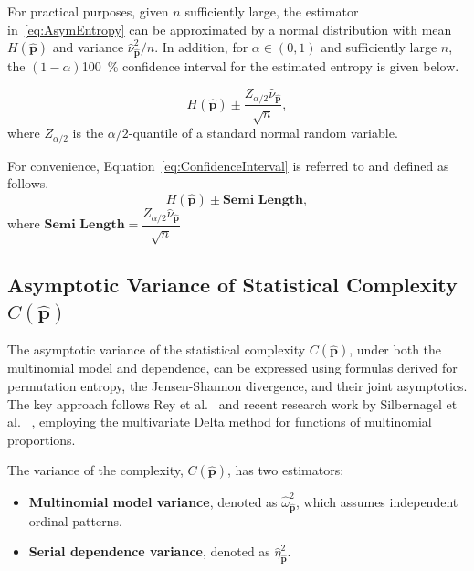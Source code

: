 For practical purposes, given $n$ sufficiently large, the estimator in~\eqref{eq:AsymEntropy} can be approximated by a normal distribution with mean $H(\widehat{\mathbf{p}})$ and variance $\widehat{\nu}^2_{\widehat{\mathbf{p}}}/n$. In addition, for $\alpha \in (0,1)$ and sufficiently large $n$, the $(1-\alpha)$\SI{100}{\percent} confidence interval for the estimated entropy is given below.

\begin{equation}
  H(\widehat{\mathbf{p}})\pm \dfrac{Z_{\alpha/2}\widehat{\nu}_{\widehat{\mathbf{p}}}}{\sqrt{n}},
  \label{eq:ConfidenceInterval}
\end{equation} 
where $Z_{\alpha/2}$ is the $\alpha/2$-quantile of a standard normal random variable.

For convenience, Equation~\ref{eq:ConfidenceInterval} is referred to and defined as follows.
\begin{equation}
	H(\widehat{\mathbf{p}})\pm \textbf{Semi Length},
	\label{eq:CI}
\end{equation} 
where $\textbf{Semi Length}=\dfrac{Z_{\alpha/2}\widehat{\nu}_{\widehat{\mathbf{p}}}}{\sqrt{n}}$

\subsection{Asymptotic Variance of Statistical Complexity $C(\widehat{\mathbf{p}})$} \label{Subsec:AsympVarComplexity} 
The asymptotic variance of the statistical complexity $C(\widehat{\mathbf{p}})$, under both the multinomial model and dependence, can be expressed using formulas derived for permutation entropy, the Jensen-Shannon divergence, and their joint asymptotics. The key approach follows Rey et al.~\cite{Rey2025} and recent research work by Silbernagel et al.~\cite{silbernagel2025joint} , employing the multivariate Delta method for functions of multinomial proportions.


The variance of the complexity, $C(\widehat{\mathbf{p}})$, has two estimators:
\begin{itemize}
	\item \textbf{Multinomial model variance}, denoted as $\widehat{\omega}^2_{\widehat{\mathbf{p}}}$, which assumes independent ordinal patterns.
	\item \textbf{Serial dependence variance}, denoted as $\widehat{\eta}^2_{\widehat{\mathbf{p}}}$.
\end{itemize}

